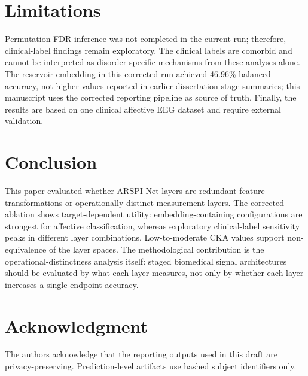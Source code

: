 \documentclass[journal]{IEEEtran}
\begin{document}
\section{Limitations}
Permutation-FDR inference was not completed in the current run; therefore, clinical-label findings remain exploratory. The clinical labels are comorbid and cannot be interpreted as disorder-specific mechanisms from these analyses alone. The reservoir embedding in this corrected run achieved 46.96\% balanced accuracy, not higher values reported in earlier dissertation-stage summaries; this manuscript uses the corrected reporting pipeline as source of truth. Finally, the results are based on one clinical affective EEG dataset and require external validation.

\section{Conclusion}
This paper evaluated whether ARSPI-Net layers are redundant feature transformations or operationally distinct measurement layers. The corrected ablation shows target-dependent utility: embedding-containing configurations are strongest for affective classification, whereas exploratory clinical-label sensitivity peaks in different layer combinations. Low-to-moderate CKA values support non-equivalence of the layer spaces. The methodological contribution is the operational-distinctness analysis itself: staged biomedical signal architectures should be evaluated by what each layer measures, not only by whether each layer increases a single endpoint accuracy.

\section*{Acknowledgment}
The authors acknowledge that the reporting outputs used in this draft are privacy-preserving. Prediction-level artifacts use hashed subject identifiers only.

\balance


\end{document}

